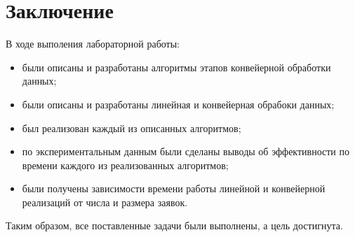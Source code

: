 \chapter*{Заключение}


В ходе выполения лабораторной работы:
\begin{itemize}[left=\parindent]
    \item были описаны и разработаны алгоритмы этапов конвейерной обработки
        данных;
    \item были описаны и разработаны линейная и конвейерная обрабоки данных;
    \item был реализован каждый из описанных алгоритмов;
    \item по экспериментальным данным были сделаны выводы об эффективности по
          времени каждого из реализованных алгоритмов;
    \item были получены зависимости времени работы линейной и конвейерной
        реализаций от числа и размера заявок.
\end{itemize}

Таким образом, все поставленные задачи были выполнены, а цель достигнута.
